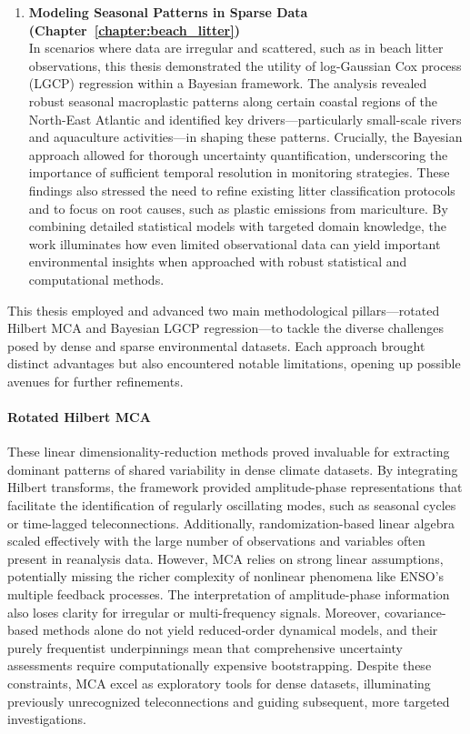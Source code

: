 \begin{enumerate}
    \item \textbf{Modeling Seasonal Patterns in Sparse Data (Chapter~\ref{chapter:beach_litter})}\\In scenarios where data are irregular and scattered, such as in beach litter observations, this thesis demonstrated the utility of log-Gaussian Cox process (LGCP) regression within a Bayesian framework. The analysis revealed robust seasonal macroplastic patterns along certain coastal regions of the North-East Atlantic and identified key drivers—particularly small-scale rivers and aquaculture activities—in shaping these patterns. Crucially, the Bayesian approach allowed for thorough uncertainty quantification, underscoring the importance of sufficient temporal resolution in monitoring strategies. These findings also stressed the need to refine existing litter classification protocols and to focus on root causes, such as plastic emissions from mariculture. By combining detailed statistical models with targeted domain knowledge, the work illuminates how even limited observational data can yield important environmental insights when approached with robust statistical and computational methods.
\end{enumerate}



This thesis employed and advanced two main methodological pillars---rotated Hilbert MCA and Bayesian LGCP regression---to tackle the diverse challenges posed by dense and sparse environmental datasets. Each approach brought distinct advantages but also encountered notable limitations, opening up possible avenues for further refinements.

\paragraph{Rotated Hilbert MCA}
These linear dimensionality-reduction methods proved invaluable for extracting dominant patterns of shared variability in dense climate datasets. By integrating Hilbert transforms, the framework provided amplitude-phase representations that facilitate the identification of regularly oscillating modes, such as seasonal cycles or time-lagged teleconnections. Additionally, randomization-based linear algebra scaled effectively with the large number of observations and variables often present in reanalysis data. However, MCA relies on strong linear assumptions, potentially missing the richer complexity of nonlinear phenomena like ENSO's multiple feedback processes. The interpretation of amplitude-phase information also loses clarity for irregular or multi-frequency signals. Moreover, covariance-based methods alone do not yield reduced-order dynamical models, and their purely frequentist underpinnings mean that comprehensive uncertainty assessments require computationally expensive bootstrapping. Despite these constraints, MCA excel as exploratory tools for dense datasets, illuminating previously unrecognized teleconnections and guiding subsequent, more targeted investigations.

